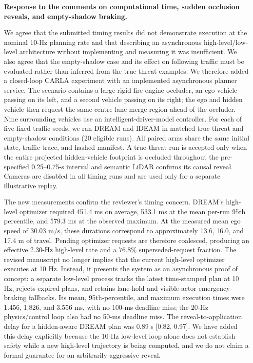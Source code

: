 
\noindent\textbf{Response to the comments on computational time, sudden
occlusion reveals, and empty-shadow braking.}

We agree that the submitted timing results did not demonstrate execution at
the nominal 10-Hz planning rate and that describing an asynchronous
high-level/low-level architecture without implementing and measuring it was
insufficient.  We also agree that the empty-shadow case and its effect on
following traffic must be evaluated rather than inferred from the
true-threat examples.  We therefore added a closed-loop CARLA experiment with
an implemented asynchronous planner service.  The scenario contains a large
rigid fire-engine occluder, an ego vehicle passing on its left, and a second
vehicle passing on its right; the ego and hidden vehicle then request the same
centre-lane merge region ahead of the occluder.  Nine surrounding vehicles
use an intelligent-driver-model controller.  For each of five fixed traffic
seeds, we ran DREAM and IDEAM in matched true-threat and empty-shadow
conditions (20 eligible runs).  All paired arms share the same initial state,
traffic trace, and hashed manifest.  A true-threat run is accepted only when
the entire projected hidden-vehicle footprint is occluded throughout the
pre-specified 0.25--0.75-s interval and semantic LiDAR confirms its causal
reveal.  Cameras are disabled in all timing runs and are used only for a
separate illustrative replay.

The new measurements confirm the reviewer's timing concern.  DREAM's
high-level optimizer required 451.4 ms on average, 533.1 ms at the mean
per-run 95th percentile, and 579.3 ms at the observed maximum.  At the
measured mean ego speed of 30.03 m/s, these durations correspond to
approximately 13.6, 16.0, and 17.4 m of travel.  Pending optimizer requests
are therefore coalesced, producing an effective 2.30-Hz high-level rate and a
76.8\% superseded-request fraction.  The revised manuscript no longer implies
that the current high-level optimizer executes at 10 Hz.  Instead, it presents
the system as an asynchronous proof of concept: a separate low-level process
tracks the latest time-stamped plan at 10 Hz, rejects expired plans, and
retains lane-hold and visible-actor emergency-braking fallbacks.  Its mean,
95th-percentile, and maximum execution times were 1.456, 1.826, and 3.556 ms,
with no 100-ms deadline miss; the 20-Hz physics/control loop also had no
50-ms deadline miss.  The reveal-to-application delay for a hidden-aware DREAM
plan was 0.89 s [0.82, 0.97].  We have added this delay explicitly because the
10-Hz low-level loop alone does not establish safety while a new high-level
trajectory is being computed, and we do not claim a formal guarantee for an
arbitrarily aggressive reveal.

